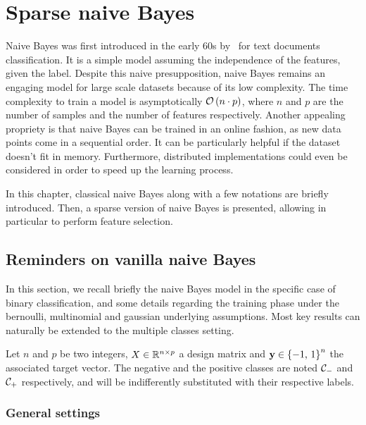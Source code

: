 \chapter{Sparse naive Bayes}\label{ch:snb}

Naive Bayes was first introduced in the early 60s by~\cite{original_naive_bayes} for text documents classification.
It is a simple model assuming the independence of the features, given the label.
Despite this naive presupposition,
naive Bayes remains an engaging model for large scale datasets because of its low complexity.
The time complexity to train a model is asymptotically $\mathcal{O}\left( n \cdot p \right)$,
where $n$ and $p$ are the number of samples and the number of features respectively.
Another appealing propriety is that naive Bayes can be trained in an online fashion,
as new data points come in a sequential order.
It can be particularly helpful if the dataset doesn't fit in memory.
Furthermore, distributed implementations could even be considered in order to speed up the learning process.

In this chapter, classical naive Bayes along with a few notations are briefly introduced.
Then, a sparse version of naive Bayes is presented,
allowing in particular to perform feature selection.

\section{Reminders on vanilla naive Bayes}\label{sec:naive_bayes}

In this section, we recall briefly the naive Bayes model in the specific case of binary classification,
and some details regarding the training phase under the bernoulli, multinomial and gaussian underlying assumptions.
Most key results can naturally be extended to the multiple classes setting.

Let $n$ and $p$ be two integers, $X \in \mathbb{R}^{n \times p}$ a design matrix
and $\mathbf{y} \in \left\{ -1,\, 1 \right\}^n$ the associated target vector.
The negative and the positive classes are noted $\mathcal{C}_-$ and $\mathcal{C}_+$ respectively,
and will be indifferently substituted with their respective labels.

\subsection{General settings}\label{subsec:nb_general}

